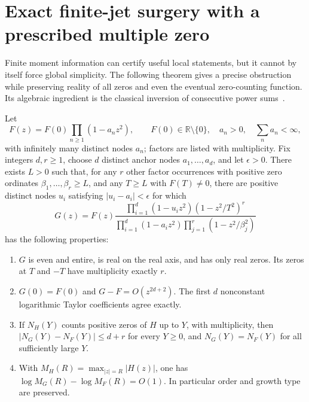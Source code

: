 \section{Exact finite-jet surgery with a prescribed multiple zero}
\label{sec:surgery}

Finite moment information can certify useful local statements, but it cannot
by itself force global simplicity. The following theorem gives a precise
obstruction while preserving reality of all zeros and even the eventual
zero-counting function. Its algebraic ingredient is the classical inversion
of consecutive power sums~\cite{powersums}.

\begin{theorem}
\label{thm:surgery}
Let
\[
 F(z)=F(0)\prod_{n\ge1}(1-a_nz^2),\qquad
 F(0)\in\mathbb R\setminus\{0\},\quad a_n>0,\quad\sum_n a_n<\infty,
\]
with infinitely many distinct nodes \(a_n\); factors are listed with
multiplicity. Fix integers \(d,r\ge1\), choose \(d\) distinct anchor nodes
\(a_1,\ldots,a_d\), and let \(\epsilon>0\).
There exists \(L>0\) such that, for any \(r\) other factor occurrences with
positive zero ordinates \(\beta_1,\ldots,\beta_r\ge L\), and any
\(T\ge L\) with \(F(T)\ne0\), there are positive distinct nodes \(u_i\)
satisfying \(|u_i-a_i|<\epsilon\) for which
\begin{equation}
 G(z)=F(z)
 \frac{\prod_{i=1}^d(1-u_i z^2)(1-z^2/T^2)^r}
 {\prod_{i=1}^d(1-a_i z^2)\prod_{j=1}^r(1-z^2/\beta_j^2)}
 \label{eq:surgery-function}
\end{equation}
has the following properties:
\begin{enumerate}[label=\textup{(\roman*)},nosep]
\item \(G\) is even and entire, is real on the real axis, and has only real
zeros. Its zeros at \(T\) and \(-T\) have multiplicity exactly \(r\).
\item \(G(0)=F(0)\) and \(G-F=O(z^{2d+2})\). The first \(d\)
nonconstant logarithmic Taylor coefficients agree exactly.
\item If \(N_H(Y)\) counts positive zeros of \(H\) up to \(Y\), with
multiplicity, then \(|N_G(Y)-N_F(Y)|\le d+r\) for every \(Y\ge0\), and
\(N_G(Y)=N_F(Y)\) for all sufficiently large \(Y\).
\item With \(M_H(R)=\max_{|z|=R}|H(z)|\), one has
\(\log M_G(R)-\log M_F(R)=O(1)\). In particular order and growth type
are preserved.
\end{enumerate}
\end{theorem}

